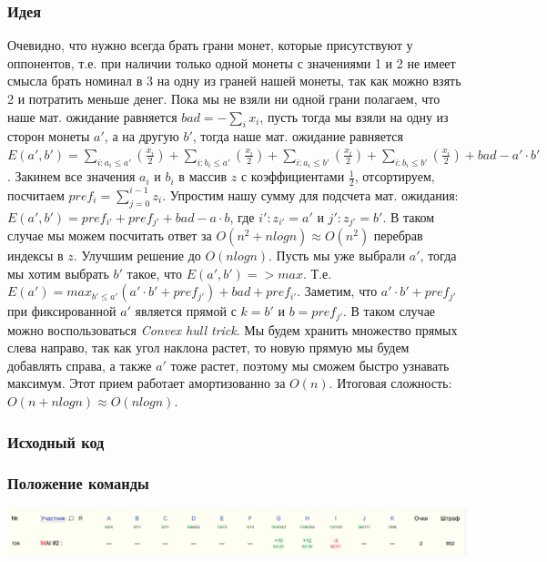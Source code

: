 \documentclass[12pt]{article}
\begin{document}
\subsubsection*{Идея}
Очевидно, что нужно всегда брать грани монет, которые присутствуют у оппонентов, т.е. при наличии только одной монеты с значениями 1 и 2 не имеет смысла брать номинал в 3 на одну из граней нашей монеты, так как можно взять 2 и потратить меньше денег. Пока мы не взяли ни одной грани полагаем, что наше мат. ожидание равняется $bad = -\sum_{i}x_i$, пусть тогда мы взяли на одну из сторон монеты $a'$, а на другую $b'$, тогда наше мат. ожидание равняется $E(a',b') = \sum_{i : a_i \leq a'}(\frac{x_i}{2}) + \sum_{i : b_i \leq a'}(\frac{x_i}{2}) + \sum_{i : a_i \leq b'}(\frac{x_i}{2}) + \sum_{i : b_i \leq b'}(\frac{x_i}{2}) + bad - a'\cdot b'$. Закинем все значения $a_i$ и $b_i$ в массив $z$ с коэффициентами $\frac{1}{2}$, отсортируем, посчитаем $pref_i = \sum_{j = 0}^{i - 1}z_i$. Упростим нашу сумму для подсчета мат. ожидания: $E(a',b') = pref_{i'} + pref_{j'} + bad - a \cdot b$, где $i' : z_{i'} = a'$ и $j' : z_{j'} = b'$. В таком случае мы можем посчитать ответ за $O(n ^ 2 + nlogn) \approx O(n ^ 2)$ перебрав индексы в $z$. Улучшим решение до $O(nlogn)$. Пусть мы уже выбрали $a'$, тогда мы хотим выбрать $b'$ такое, что $E(a', b') => max$. Т.е. $E(a') = max_{b' \leq a'}(a'\cdot b' + pref_{j'}) + bad + pref_{i'}$. Заметим, что $a'\cdot b' + pref_{j'}$ при фиксированной $a'$ является прямой с $k = b'$ и $b = pref_{j'}$. В таком случае можно воспользоваться \textit{Convex hull trick}. Мы будем хранить множество прямых слева направо, так как угол наклона растет, то новую прямую мы будем добавлять справа, а также $a'$ тоже растет, поэтому мы сможем быстро узнавать максимум. Этот прием работает амортизованно за $O(n)$. Итоговая сложность: $O(n + nlogn) \approx O(nlogn)$.
\subsubsection*{Исходный код}

\subsubsection*{Положение команды}
\includegraphics[scale=0.25]{images/gp_dolgop.png}\newline\noindent
\pagebreak
\end{document}
